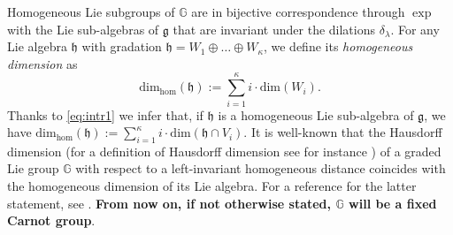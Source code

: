 \documentclass[10pt, a4paper,
oneside, headinclude,footinclude]{scrartcl}
\begin{document}
Homogeneous Lie subgroups of $\mathbb{G}$ are in bijective correspondence through $\exp$ with the Lie sub-algebras of $\mathfrak{g}$ that are invariant under the dilations $\delta_\lambda$. 
For any Lie algebra $\mathfrak{h}$ with gradation $\mathfrak h= W_1\oplus\ldots\oplus W_{\kappa}$, we define its \emph{homogeneous dimension} as
$$\text{dim}_{\mathrm{hom}}(\mathfrak{h}):=\sum_{i=1}^{\kappa} i\cdot\text{dim}(W_i).$$
Thanks to \eqref{eq:intr1} we infer that, if $\mathfrak{h}$ is a homogeneous Lie sub-algebra of $\mathfrak{g}$, we have $\text{dim}_{\mathrm{hom}}(\mathfrak{h}):=\sum_{i=1}^{\kappa} i\cdot\text{dim}(\mathfrak{h}\cap V_i)$. It is well-known that the Hausdorff dimension (for a definition of Hausdorff dimension see for instance \cite[Definition 4.8]{Mattila1995GeometrySpaces}) of a graded Lie group $\mathbb G$ with respect to a left-invariant homogeneous distance coincides with the homogeneous dimension of its Lie algebra. For a reference for the latter statement, see \cite[Theorem 4.4]{LDNG19}. \textbf{From now on, if not otherwise stated, $\mathbb G$ will be a fixed Carnot group}.

\end{document}
